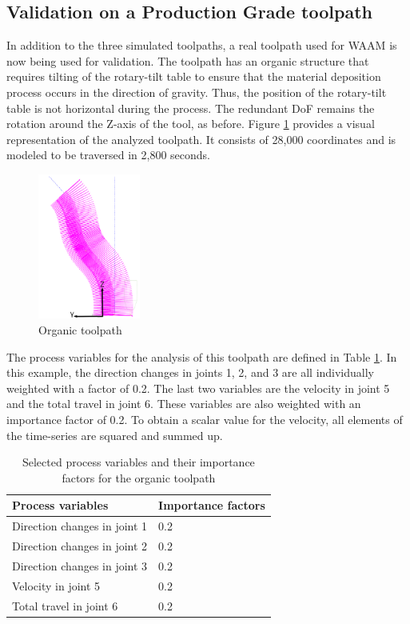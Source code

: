 \subsection{Validation on a Production Grade toolpath}\label{RG}
In addition to the three simulated toolpaths, a real toolpath used for \acrshort{WAAM} is now being used for validation. The toolpath has an organic structure that requires tilting of the rotary-tilt table to ensure that the material deposition process occurs in the direction of gravity. Thus, the position of the rotary-tilt table is not horizontal during the process. The redundant \acrshort{DoF} remains the rotation around the Z-axis of the tool, as before. Figure \ref{rav} provides a visual representation of the analyzed toolpath. It consists of 28,000 coordinates and is modeled to be traversed in 2,800 seconds.

\begin{figure}[H]
	\centerline{\includegraphics[width=0.3\textwidth]{figures/raven.png}}
	\caption{Organic toolpath \cite{Reisch.2023}}
	\label{rav}
\end{figure}

The process variables for the analysis of this toolpath are defined in Table \ref{ravenparams}. In this example, the direction changes in joints 1, 2, and 3 are all individually weighted with a factor of 0.2. The last two variables are the velocity in joint 5 and the total travel in joint 6. These variables are also weighted with an importance factor of 0.2. To obtain a scalar value for the velocity, all elements of the time-series are squared and summed up. 

\begin{table}[H]
	\centering
	\begin{tabular}{||l|l||}
		Process variables& Importance factors \\
		\hline
		\hline
		\hline
		Direction changes in joint 1	&		0.2 \\
		Direction changes in joint 2	&		0.2 \\
		Direction changes in joint 3	&		0.2 \\
		Velocity in joint 5	&		0.2 \\
		Total travel in joint 6	&		0.2 \\
		\hline
		\hline
	\end{tabular}
	
	\caption{Selected process variables and their importance factors for the organic toolpath}
	\label{ravenparams}
\end{table}

